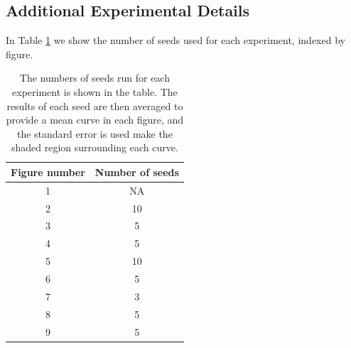 \documentclass{article} %
\begin{document}
\subsection{Additional Experimental Details}
\label{sec:additional_details}
In Table \ref{table:seeds} we show the number of seeds used for each experiment, indexed by figure.

\begin{table}[!ht]
\centering
\begin{tabular}{c | c} 
 Figure number & Number of seeds  \\ [0.5ex] 
 \hline
 1 & NA  \\
 2 & 10  \\
 3 & 5  \\
 4 & 5  \\
 5 & 10  \\
 6 & 5  \\
 7 & 3  \\
 8 & 5  \\
 9 & 5  \\
\end{tabular}
\caption{The numbers of seeds run for each experiment is shown in the table. The results of each seed are then averaged to provide a mean curve in each figure, and the standard error is used make the shaded region surrounding each curve.}
\label{table:seeds}
\end{table}
\end{document}
